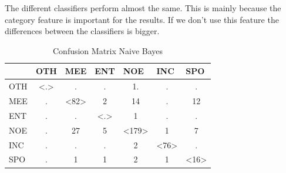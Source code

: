 \documentclass[
10pt, %
a4paper, %
oneside, %
headinclude,footinclude, %
BCOR5mm, %
]{scrartcl}
\begin{document}
The different classifiers perform almost the same. This is mainly because the category feature is important for the results. If we don't use this feature the differences between the classifiers is bigger.

\begin{table}[h]
\caption[Confusion Matrix Naive Bayes]{Confusion Matrix Naive Bayes }
\begin{tabular}{|l|c|c|c|c|c|c|}
\hline
    & \multicolumn{1}{l|}{OTH} & \multicolumn{1}{l|}{MEE} & \multicolumn{1}{l|}{ENT} & \multicolumn{1}{l|}{NOE} & \multicolumn{1}{l|}{INC} & \multicolumn{1}{l|}{SPO} \\ \hline
OTH & \textless.\textgreater   & .                        & .                        & 1.                       & .                        & .                        \\ \hline
MEE & .                        & \textless82\textgreater  & 2                        & 14                       & .                        & 12                       \\ \hline
ENT & .                        & .                        & \textless.\textgreater   & 1                        & .                        & .                        \\ \hline
NOE & .                        & 27                       & 5                        & \textless179\textgreater & 1                        & 7                        \\ \hline
INC & .                        & .                        & .                        & 2                        & \textless76\textgreater  & .                        \\ \hline
SPO & .                        & 1                        & 1                        & 2                        & 1                        & \textless16\textgreater  \\ \hline
\end{tabular}


\end{table}
\end{document}

